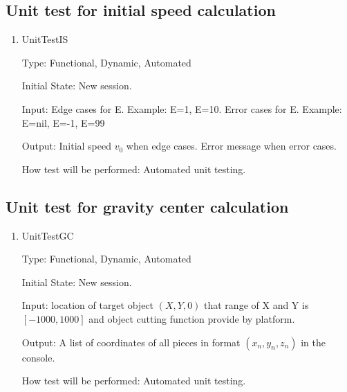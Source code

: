 \documentclass[12pt, titlepage]{article}
\begin{document}
\subsection{Unit test for initial speed calculation}

\begin{enumerate}
	
	\item{UnitTestIS\\}
	
	Type: Functional, Dynamic, Automated
	
	Initial State: New session.
	
	Input: Edge cases for E. Example: E=1, E=10.
		Error cases for E. Example: E=nil, E=-1, E=99
	
	Output: Initial speed $v_{0}$ when edge cases.
			Error message when error cases.
	
	How test will be performed: Automated unit testing.
	
\end{enumerate}

\subsection{Unit test for gravity center calculation}


\begin{enumerate}
	
	\item{UnitTestGC\\}
	
	Type: Functional, Dynamic, Automated
	
	Initial State: New session.
	
	Input: location of target object $(X,Y,0)$ that range of X and Y is $[-1000,1000]$ and object cutting function provide by platform. 
	
	Output: A list of coordinates of all pieces in format $(x_{n},y_{n},z_{n})$ in the console.
	
	How test will be performed: Automated unit testing.
	
\end{enumerate}
\end{document}
